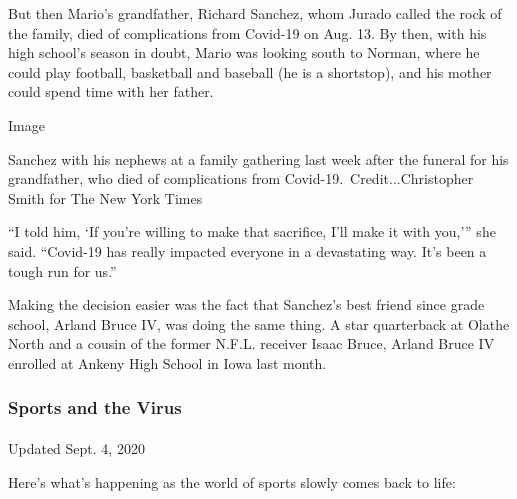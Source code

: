 But then Mario's grandfather, Richard Sanchez, whom Jurado called the
rock of the family, died of complications from Covid-19 on Aug. 13. By
then, with his high school's season in doubt, Mario was looking south to
Norman, where he could play football, basketball and baseball (he is a
shortstop), and his mother could spend time with her father.

Image

Sanchez with his nephews at a family gathering last week after the
funeral for his grandfather, who died of complications from
Covid-19.~Credit...Christopher Smith for The New York Times

``I told him, `If you're willing to make that sacrifice, I'll make it
with you,''' she said. ``Covid-19 has really impacted everyone in a
devastating way. It's been a tough run for us.''

Making the decision easier was the fact that Sanchez's best friend since
grade school, Arland Bruce IV, was doing the same thing. A star
quarterback at Olathe North and a cousin of the former N.F.L. receiver
Isaac Bruce, Arland Bruce IV enrolled at Ankeny High School in Iowa last
month.

\hypertarget{sports-and-the-virus}{%
\subsubsection{Sports and the Virus}\label{sports-and-the-virus}}

\paragraph{}

Updated Sept. 4, 2020

Here's what's happening as the world of sports slowly comes back to
life:

